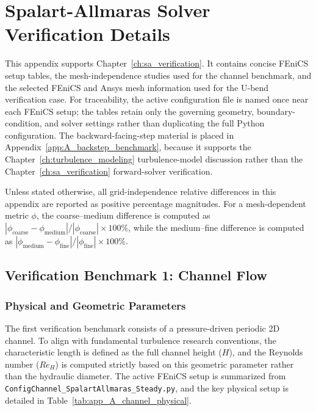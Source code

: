 \chapter{Spalart-Allmaras Solver Verification Details}
\label{app:B_sa_solver_verification}

This appendix supports Chapter~\ref{ch:sa_verification}. It contains concise FEniCS setup tables, the mesh-independence studies used for the channel benchmark, and the selected FEniCS and Ansys mesh information used for the U-bend verification case. For traceability, the active configuration file is named once near each FEniCS setup; the tables retain only the governing geometry, boundary-condition, and solver settings rather than duplicating the full Python configuration. The backward-facing-step material is placed in Appendix~\ref{app:A_backstep_benchmark}, because it supports the Chapter~\ref{ch:turbulence_modeling} turbulence-model discussion rather than the Chapter~\ref{ch:sa_verification} forward-solver verification.

Unless stated otherwise, all grid-independence relative differences in this appendix are reported as positive percentage magnitudes. For a mesh-dependent metric $\phi$, the coarse--medium difference is computed as $|\phi_{\mathrm{coarse}}-\phi_{\mathrm{medium}}|/|\phi_{\mathrm{coarse}}|\times100\%$, while the medium--fine difference is computed as $|\phi_{\mathrm{medium}}-\phi_{\mathrm{fine}}|/|\phi_{\mathrm{fine}}|\times100\%$.

\section{Verification Benchmark 1: Channel Flow}
\label{sec:app_A_channel}

\subsection{Physical and Geometric Parameters}
\label{subsec:app_A_channel_physical}
The first verification benchmark consists of a pressure-driven periodic 2D channel. To align with fundamental turbulence research conventions, the characteristic length is defined as the full channel height ($H$), and the Reynolds number ($Re_H$) is computed strictly based on this geometric parameter rather than the hydraulic diameter. The active FEniCS setup is summarized from \texttt{ConfigChannel\_SpalartAllmaras\_Steady.py}, and the key physical setup is detailed in Table~\ref{tab:app_A_channel_physical}.

